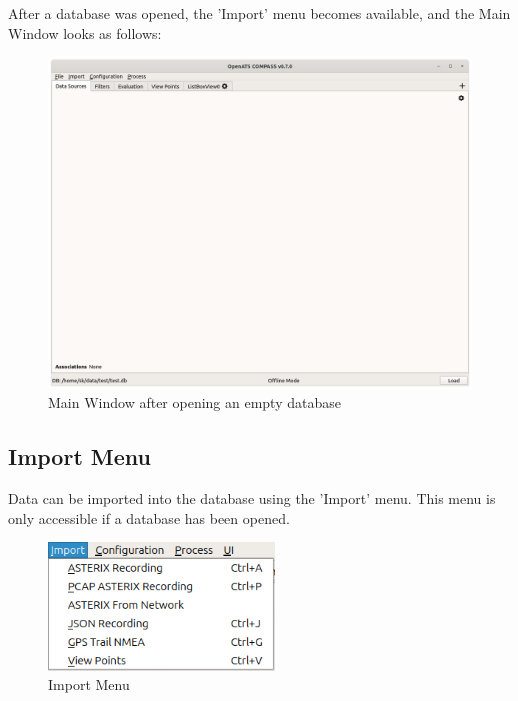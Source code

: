 After a database was opened, the 'Import' menu becomes available, and the Main Window looks as follows:

\begin{figure}[H]
  \hspace*{-2.5cm}
    \includegraphics[width=19cm]{figures/main_window_opened.png}
  \caption{Main Window after opening an empty database}
\end{figure}

\subsection{Import Menu}
\label{sec:ui_overview_import_menu}

Data can be imported into the database using the 'Import' menu. This menu is only accessible if a database has been opened.

\begin{figure}[H]
  \center
    \includegraphics[width=6cm,frame]{figures/ui_import_menu.png}
  \caption{Import Menu}
\end{figure}

